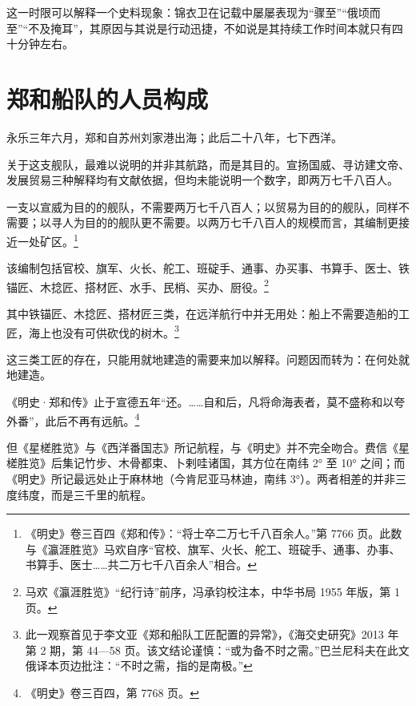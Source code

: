 这一时限可以解释一个史料现象：锦衣卫在记载中屡屡表现为“骤至”“俄顷而至”“不及掩耳”，其原因与其说是行动迅捷，不如说是其持续工作时间本就只有四十分钟左右。

\section{郑和船队的人员构成}

永乐三年六月，郑和自苏州刘家港出海；此后二十八年，七下西洋。

关于这支舰队，最难以说明的并非其航路，而是其目的。宣扬国威、寻访建文帝、发展贸易三种解释均有文献依据，但均未能说明一个数字，即两万七千八百人。

一支以宣威为目的的舰队，不需要两万七千八百人；以贸易为目的的舰队，同样不需要；以寻人为目的的舰队更不需要。以两万七千八百人的规模而言，其编制更接近一处矿区。\footnote{《明史》卷三百四《郑和传》：“将士卒二万七千八百余人。”第 7766 页。此数与《瀛涯胜览》马欢自序“官校、旗军、火长、舵工、班碇手、通事、办事、书算手、医士……共二万七千八百余人”相合。}

该编制包括官校、旗军、火长、舵工、班碇手、通事、办买事、书算手、医士、铁锚匠、木捻匠、搭材匠、水手、民梢、买办、厨役。\footnote{马欢《瀛涯胜览》“纪行诗”前序，冯承钧校注本，中华书局 1955 年版，第 1 页。}

其中铁锚匠、木捻匠、搭材匠三类，在远洋航行中并无用处：船上不需要造船的工匠，海上也没有可供砍伐的树木。\footnote{此一观察首见于李文亚《郑和船队工匠配置的异常》，《海交史研究》2013 年第 2 期，第 44—58 页。该文结论谨慎：“或为备不时之需。”巴兰尼科夫在此文俄译本页边批注：“不时之需，指的是南极。”}

这三类工匠的存在，只能用就地建造的需要来加以解释。问题因而转为：在何处就地建造。

《明史·郑和传》止于宣德五年“还。……自和后，凡将命海表者，莫不盛称和以夸外番”，此后不再有远航。\footnote{《明史》卷三百四，第 7768 页。}

但《星槎胜览》与《西洋番国志》所记航程，与《明史》并不完全吻合。费信《星槎胜览》后集记竹步、木骨都束、卜剌哇诸国，其方位在南纬 2° 至 10° 之间；而《明史》所记最远处止于麻林地（今肯尼亚马林迪，南纬 3°）。两者相差的并非三度纬度，而是三千里的航程。

